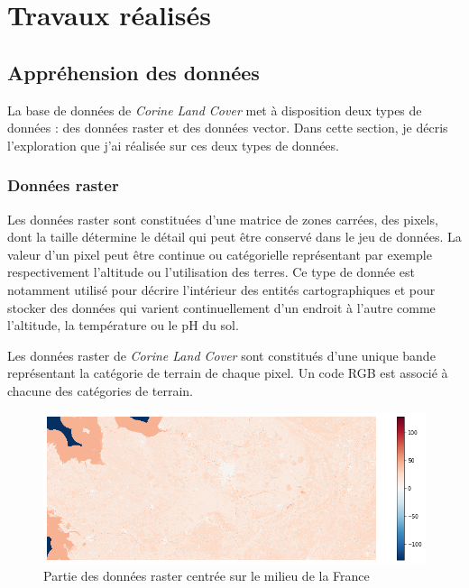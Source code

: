\chapter{Travaux réalisés}


\section{Appréhension des données}


La base de données de \emph{Corine Land Cover} met à disposition deux types de données : des données raster et des données vector.
Dans cette section, je décris l'exploration que j'ai réalisée sur ces deux types de données.

\subsection{Données raster}

Les données raster sont constituées d'une matrice de zones carrées, des pixels, dont la taille détermine le détail qui peut être conservé dans le jeu de données.
La valeur d'un pixel peut être continue ou catégorielle représentant par exemple respectivement l'altitude ou l'utilisation des terres.
Ce type de donnée est notamment utilisé pour décrire l'intérieur des entités cartographiques et pour stocker des données qui varient continuellement d'un endroit à l'autre comme l'altitude, la température ou le pH du sol.


Les données raster de \emph{Corine Land Cover} sont constitués d'une unique bande représentant la catégorie de terrain de chaque pixel.
Un code RGB est associé à chacune des catégories de terrain.


\begin{figure}
    \centering
    \includegraphics[scale=0.5]{figures/raster}
    \caption{Partie des données raster centrée sur le milieu de la France}
\end{figure}

